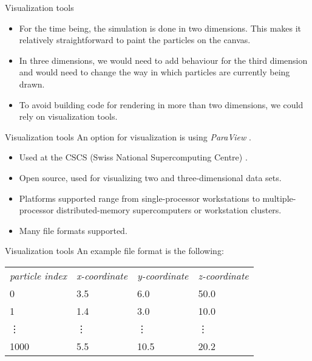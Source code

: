 \documentclass[aspectratio=169]{beamer}
\begin{document}
\begin{frame}[fragile]{Visualization tools}
	\begin{itemize}
		\item For the time being, the simulation is done in two dimensions. This makes it relatively straightforward to paint the particles on the canvas.
		\item In three dimensions, we would need to add behaviour for the third dimension and would need to change the way in which particles are currently being drawn.
		\item To avoid building code for rendering in more than two dimensions, we could rely on visualization tools.
	\end{itemize}
\end{frame}

\begin{frame}[fragile]{Visualization tools}
	An option for visualization is using \emph{ParaView} \cite{website:paraview_wiki}.
	\begin{itemize}
		\item Used at the CSCS (Swiss National Supercomputing Centre) \cite{website:cscs}.
		\item Open source, used for visualizing two and three-dimensional data sets.
		\item Platforms supported range from single-processor workstations to multiple-processor distributed-memory supercomputers or workstation clusters.
		\item Many file formats supported.
	\end{itemize}
\end{frame}

\begin{frame}[fragile]{Visualization tools}
	An example file format is the following:
	\begin{table}
		\centering
		\begin{tabular}{l l l l}
			\emph{particle index} & \emph{x-coordinate} & \emph{y-coordinate} & \emph{z-coordinate} \\
			0 & 3.5 & 6.0 & 50.0\\
			1 & 1.4 & 3.0 & 10.0\\
			\vdots & \vdots & \vdots & \vdots\\
			1000 & 5.5 & 10.5 & 20.2\\
		\end{tabular}
	\end{table}
\end{frame}
\end{document}
